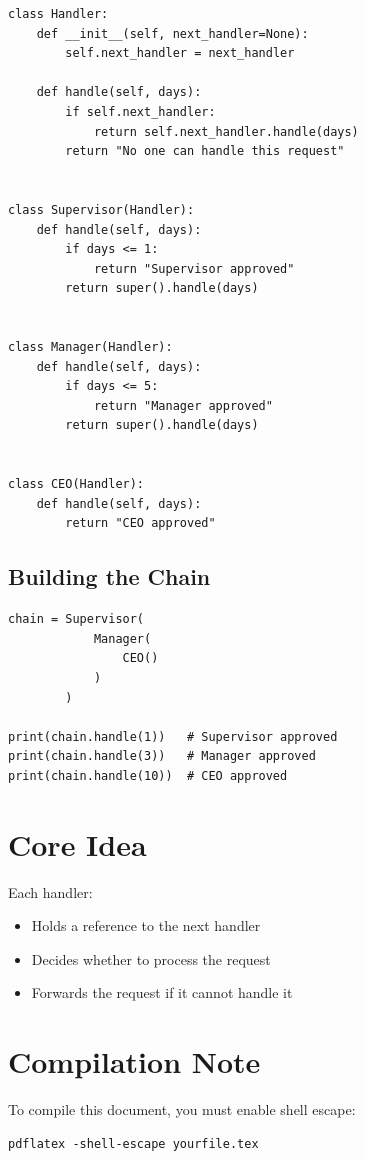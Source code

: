\documentclass{article}
\begin{document}
            \begin{verbatim}
class Handler:
    def __init__(self, next_handler=None):
        self.next_handler = next_handler

    def handle(self, days):
        if self.next_handler:
            return self.next_handler.handle(days)
        return "No one can handle this request"


class Supervisor(Handler):
    def handle(self, days):
        if days <= 1:
            return "Supervisor approved"
        return super().handle(days)


class Manager(Handler):
    def handle(self, days):
        if days <= 5:
            return "Manager approved"
        return super().handle(days)


class CEO(Handler):
    def handle(self, days):
        return "CEO approved"
            \end{verbatim}
        
        \subsection{Building the Chain}
            
            \begin{verbatim}
chain = Supervisor(
            Manager(
                CEO()
            )
        )

print(chain.handle(1))   # Supervisor approved
print(chain.handle(3))   # Manager approved
print(chain.handle(10))  # CEO approved
            \end{verbatim}
    
    
    \section{Core Idea}
        
        Each handler:
        
        \begin{itemize}
            \item Holds a reference to the next handler
            \item Decides whether to process the request
            \item Forwards the request if it cannot handle it
        \end{itemize}
    
    
    \section{Compilation Note}
        
        To compile this document, you must enable shell escape:
        
        \begin{verbatim}
pdflatex -shell-escape yourfile.tex
        \end{verbatim}
\end{document}
